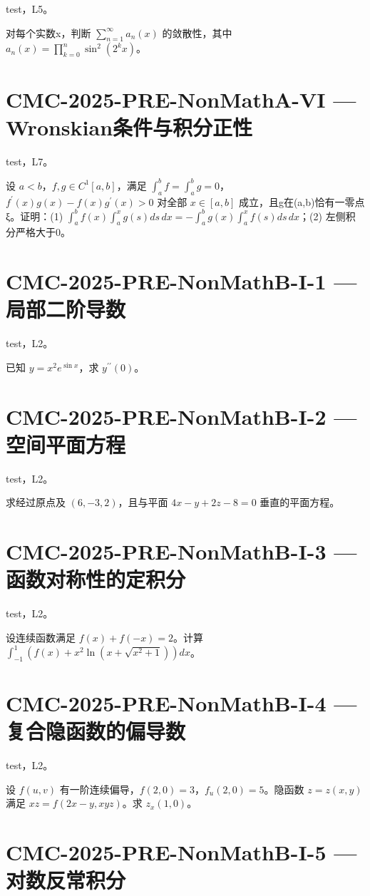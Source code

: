 \documentclass[UTF8]{ctexart}
\begin{document}
test，L5。

对每个实数x，判断 $\displaystyle\sum_{n=1}^\infty a_n(x)$ 的敛散性，其中 $a_n(x)=\prod_{k=0}^n\sin^2(2^k x)$。

\section*{CMC-2025-PRE-NonMathA-VI — Wronskian条件与积分正性}

test，L7。

设 $a<b$，$f,g\in C^1[a,b]$，满足 $\int_a^bf=\int_a^bg=0$，$f^{\prime}(x)g(x)-f(x)g^{\prime}(x)>0$ 对全部 $x\in[a,b]$ 成立，且g在(a,b)恰有一零点ξ。证明：(1) $\int_a^b f(x)\int_a^xg(s)ds\,dx=-\int_a^b g(x)\int_a^xf(s)ds\,dx$；(2) 左侧积分严格大于0。

\section*{CMC-2025-PRE-NonMathB-I-1 — 局部二阶导数}

test，L2。

已知 $y=x^2e^{\sin x}$，求 $y^{\prime\prime}(0)$。

\section*{CMC-2025-PRE-NonMathB-I-2 — 空间平面方程}

test，L2。

求经过原点及 $(6,-3,2)$，且与平面 $4x-y+2z-8=0$ 垂直的平面方程。

\section*{CMC-2025-PRE-NonMathB-I-3 — 函数对称性的定积分}

test，L2。

设连续函数满足 $f(x)+f(-x)=2$。计算 $\displaystyle\int_{-1}^1(f(x)+x^2\ln(x+\sqrt{x^2+1}))dx$。

\section*{CMC-2025-PRE-NonMathB-I-4 — 复合隐函数的偏导数}

test，L2。

设 $f(u,v)$ 有一阶连续偏导，$f(2,0)=3$，$f_u(2,0)=5$。隐函数 $z=z(x,y)$ 满足 $xz=f(2x-y,xyz)$。求 $z_x(1,0)$。

\section*{CMC-2025-PRE-NonMathB-I-5 — 对数反常积分}
\end{document}

